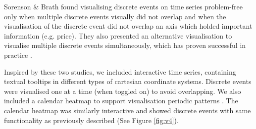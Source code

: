 Sorenson \& Brath found visualising discrete events on time series problem-free only when multiple discrete events visually did not overlap and when the visualisation of the discrete event did not overlap an axis which holded important information (e.g. price). They also presented an alternative visualisation to visualise multiple discrete events simultaneously, which has proven successful in practice \citep{sorenson2013}.

Inspired by these two studies, we included interactive time series, containing textual tooltips in different types of cartesian coordinate systems. Discrete events were visualised one at a time (when toggled on) to avoid overlapping. We also included a calendar heatmap to support visualisation periodic patterns \citep{Cuttone}. The calendar heatmap was similarly interactive and showed discrete events with same functionality as previously  described (See Figure \ref{fig:v4}). 


